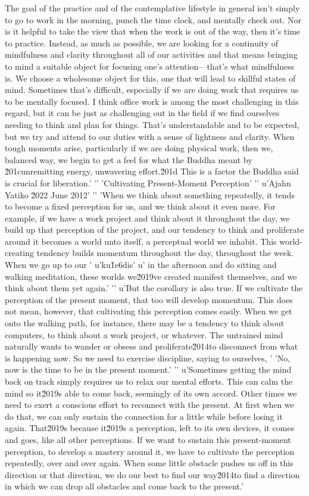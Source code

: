 The goal of the practice and of the contemplative lifestyle in general 
isn't simply to go to work in the morning, punch the time clock, and 
mentally check out. Nor is it helpful to take the view that when the 
work is out of the way, then it's time to practice. Instead, as much as 
possible, we are looking for a continuity of mindfulness and clarity 
throughout all of our activities and that means bringing to mind a 
suitable object for focusing one's attention---that's what mindfulness 
is. We choose a wholesome object for this, one that will lead to 
skillful states of mind. Sometimes that's difficult, especially if we 
are doing work that requires us to be mentally focused. I think office 
work is among the most challenging in this regard, but it can be just 
as challenging out in the field if we find ourselves needing to think 
and plan for things. That's understandable and to be expected, but we 
try and attend to our duties with a sense of lightness and clarity. 
When tough moments arise, particularly if we are doing physical work, 
then we, balanced way, we begin to get a feel for what the Buddha meant by \u201cunremitting energy, unwavering effort.\u201d This is a factor the Buddha said is crucial for liberation.'
'\n'
'Cultivating Present-Moment Perception'
'\n'
u'Ajahn Yatiko \u2022 June 2012'
'\n'
'When we think about something repeatedly, it tends to become a fixed perception for us, and we think about it even more. For example, if we have a work project and think about it throughout the day, we build up that perception of the project, and our tendency to think and proliferate around it becomes a world unto itself, a perceptual world we inhabit. This world-creating tendency builds momentum throughout the day, throughout the week. When we go up to our '
u'ku\u1e6dis'
u' in the afternoon and do sitting and walking meditation, these worlds we\u2019ve created manifest themselves, and we think about them yet again.'
'\n'
u'But the corollary is also true. If we cultivate the perception of the present moment, that too will develop momentum. This does not mean, however, that cultivating this perception comes easily. When we get onto the walking path, for instance, there may be a tendency to think about computers, to think about a work project, or whatever. The untrained mind naturally wants to wander or obsess and proliferate\u2014to disconnect from what is happening now. So we need to exercise discipline, saying to ourselves, '
'No, now is the time to be in the present moment.'
'\n'
u'Sometimes getting the mind back on track simply requires us to relax our mental efforts. This can calm the mind so it\u2019s able to come back, seemingly of its own accord. Other times we need to exert a conscious effort to reconnect with the present. At first when we do that, we can only sustain the connection for a little while before losing it again. That\u2019s because it\u2019s a perception, left to its own devices, it comes and goes, like all other perceptions. If we want to sustain this present-moment perception, to develop a mastery around it, we have to cultivate the perception repeatedly, over and over again. When some little obstacle pushes us off in this direction or that direction, we do our best to find our way\u2014to find a direction in which we can drop all obstacles and come back to the present.'
